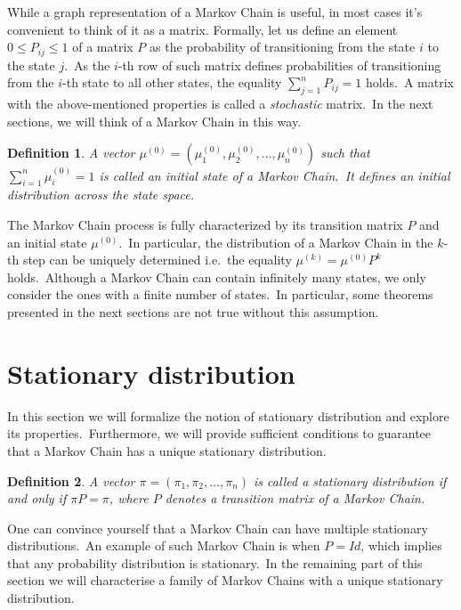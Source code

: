 \documentclass[a4paper, 11pt, onecolumn, openany, titlepage]{report}
\theoremstyle{default_theorem_style}\newtheorem{theorem}{Theorem}
\theoremstyle{default_theorem_style}\newtheorem{definition}{Definition}
\begin{document}
While a graph representation of a Markov Chain is useful, in most cases it's convenient to think of it as a matrix.
Formally, let us define an element $0 \leq P_{ij} \leq 1$ of a matrix $P$ as the probability of
transitioning from the state $i$ to the state $j$.\ As the $i$-th row of such matrix defines probabilities of
transitioning from the $i$-th  state to all other states, the equality $\sum_{j = 1}^{n} P_{ij} = 1$ holds.\ A
matrix with the above-mentioned properties is called a \textit{stochastic} matrix.\ In the next sections, we will think
of a Markov Chain in this way.

\begin{definition}
A vector $\mu^{(0)} = (\mu^{(0)}_1, \mu^{(0)}_2, \dots, \mu^{(0)}_n)$ such that $\sum_{i=1}^{n} \mu^{(0)}_i = 1$
is called an \textit{initial state} of a Markov Chain.\ It defines an initial distribution across the state space.

\end{definition}

The Markov Chain process is fully characterized by its transition matrix $P$ and an initial state $\mu^{(0)}$.\ In
particular, the distribution of a Markov Chain in the $k$-th step can be uniquely determined i.e.\ the equality
$\mu^{(k)} = \mu^{(0)}P^k$ holds.\ Although a Markov Chain can contain infinitely many states, we only consider
the ones with a finite number of states.\ In particular, some theorems presented in the next sections
are not true without this assumption.\newline

\section{Stationary distribution}

In this section we will formalize the notion of stationary distribution and explore its properties.\ Furthermore,
we will provide sufficient conditions to guarantee that a Markov Chain has a unique stationary distribution.

\begin{definition}
A vector $\pi = (\pi_1, \pi_2, \dots, \pi_n)$ is called a \textit{stationary} distribution if and only if $\pi P = \pi$,
where $P$ denotes a transition matrix of a Markov Chain.
\end{definition}

One can convince yourself that a Markov Chain can have multiple stationary distributions.\ An example of such Markov
Chain is when $P = Id$, which implies that any probability distribution is stationary.\ In the remaining part of this
section we will characterise a family of Markov Chains with a unique stationary distribution.
\end{document}
